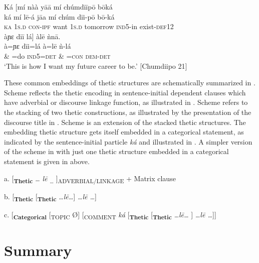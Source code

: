 \documentclass[output=paper]{langsci/langscibook}
\begin{document}
\ea
\glll \textup{}  Ká  \textup{[}mí    nàà    y\={a}\={a}    mí    chúmd\={i}\={i}p\={o}            b\={o}ká\\
  \textup{  ká   mí    l\={e}-á      j\={a}a    mí    chúm        d\={i}i-p\={o}    b\={o}-ká}\\
     \textsc{  ka}   1\textsc{s.d}  \textsc{con-ipf}    want  1\textsc{s}.\textsc{d } tomorrow     \textsc{ind}5-in     exist-\textsc{def}12\\
\glll   àɲɛ    d\={i}\={i}   lá\textup{]   } àl\={e}    ǹn\={a}.\\
  \textup{  à=ɲɛ  d\={i}i=lá    à=l\={e}    ǹ-lá}\\
       \& =do  \textsc{ind}\textsc{5=}\textsc{det}\textsc{  \& =}\textsc{con}\textsc{ } \textsc{dem-det}\\
\glt ‘This is how I want my future career to be.’ [Chumdiipo 21]\\

\z

These common embeddings of thetic structures are schematically summarized in . Scheme  reflects the thetic encoding in sentence-initial dependent clauses which have adverbial or discourse linkage function, as illustrated in . Scheme  refers to the stacking of two thetic constructions, as illustrated by the presentation of the discourse title in . Scheme  is an extension of the stacked thetic structures. The embedding thetic structure gets itself embedded in a categorical statement, as indicated by the sentence-initial particle \textit{ká} and illustrated in . A simpler version of the scheme in  with just one thetic structure embedded in a categorical statement is given in  above. 

\ea
{a.  [\textbf{\textsubscript{Thetic}} \textit{… l\={e}}\textsubscript{ …} ]\textsubscript{ADVERBIAL/LINKAGE} + Matrix clause} 

    b.   [\textbf{\textsubscript{Thetic}}\textsubscript{ } [\textbf{\textsubscript{Thetic}} \textit{…l\={e}…}] \textit{…l\={e} …}]

    c.   [\textbf{\textsubscript{Categorical}}\textsubscript{} [\textsubscript{TOPIC} Ø]\textsubscript{} [\textsubscript{COMMENT}\textit{ ká} [\textbf{\textsubscript{Thetic}}\textsubscript{ } [\textbf{\textsubscript{Thetic}} \textit{…l\={e}…} ] \textit{…l\={e} …}]]
\z

\section{Summary}\label{sec:schwarz:4}
\end{document}

